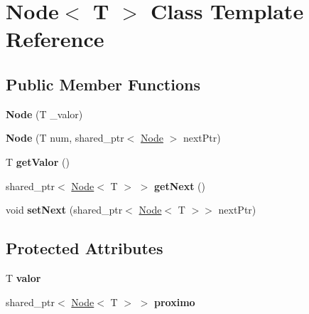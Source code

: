 \hypertarget{classNode}{}\section{Node$<$ T $>$ Class Template Reference}
\label{classNode}
\subsection*{Public Member Functions}
\begin{DoxyCompactItemize}
\item 
{\bfseries Node} (T \+\_\+valor)\hypertarget{classNode_ae00c7c803c5b2fea3b2270050da4a9db}{}\label{classNode_ae00c7c803c5b2fea3b2270050da4a9db}

\item 
{\bfseries Node} (T num, shared\+\_\+ptr$<$ \hyperlink{classNode}{Node} $>$ next\+Ptr)\hypertarget{classNode_af67f09d322ec9a1fc2852ff98f0a4558}{}\label{classNode_af67f09d322ec9a1fc2852ff98f0a4558}

\item 
T {\bfseries get\+Valor} ()\hypertarget{classNode_aac9fa54166ff3aa269de6da8f9484f66}{}\label{classNode_aac9fa54166ff3aa269de6da8f9484f66}

\item 
shared\+\_\+ptr$<$ \hyperlink{classNode}{Node}$<$ T $>$ $>$ {\bfseries get\+Next} ()\hypertarget{classNode_a85f16577c580d8fdc246f350c5a6141a}{}\label{classNode_a85f16577c580d8fdc246f350c5a6141a}

\item 
void {\bfseries set\+Next} (shared\+\_\+ptr$<$ \hyperlink{classNode}{Node}$<$ T $>$$>$ next\+Ptr)\hypertarget{classNode_a73ec6e581244130c98a26ed2935cf472}{}\label{classNode_a73ec6e581244130c98a26ed2935cf472}

\end{DoxyCompactItemize}
\subsection*{Protected Attributes}
\begin{DoxyCompactItemize}
\item 
T {\bfseries valor}\hypertarget{classNode_ae7133548e1ffddfd6bab32e684094dbe}{}\label{classNode_ae7133548e1ffddfd6bab32e684094dbe}

\item 
shared\+\_\+ptr$<$ \hyperlink{classNode}{Node}$<$ T $>$ $>$ {\bfseries proximo}\hypertarget{classNode_a26c14ea34fca953ae3f847245c3e9caa}{}\label{classNode_a26c14ea34fca953ae3f847245c3e9caa}

\end{DoxyCompactItemize}
